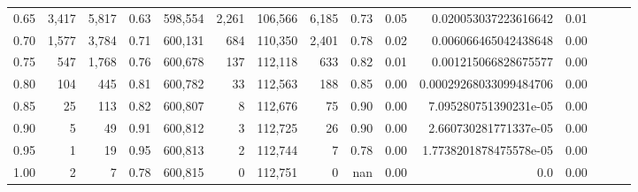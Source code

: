 \begin{tabular}{rrrrrrrrrrrrrrr}
0.65 &    3,417 &   5,817 &  0.63 &  598,554 &    2,261 &  106,566 &    6,185 &  0.73 &  0.05 &    0.020053037223616642 &      0.01 \\
0.70 &    1,577 &   3,784 &  0.71 &  600,131 &      684 &  110,350 &    2,401 &  0.78 &  0.02 &    0.006066465042438648 &      0.00 \\
0.75 &      547 &   1,768 &  0.76 &  600,678 &      137 &  112,118 &      633 &  0.82 &  0.01 &    0.001215066828675577 &      0.00 \\
0.80 &      104 &     445 &  0.81 &  600,782 &       33 &  112,563 &      188 &  0.85 &  0.00 &  0.00029268033099484706 &      0.00 \\
0.85 &       25 &     113 &  0.82 &  600,807 &        8 &  112,676 &       75 &  0.90 &  0.00 &   7.095280751390231e-05 &      0.00 \\
0.90 &        5 &      49 &  0.91 &  600,812 &        3 &  112,725 &       26 &  0.90 &  0.00 &   2.660730281771337e-05 &      0.00 \\
0.95 &        1 &      19 &  0.95 &  600,813 &        2 &  112,744 &        7 &  0.78 &  0.00 &  1.7738201878475578e-05 &      0.00 \\
1.00 &        2 &       7 &  0.78 &  600,815 &        0 &  112,751 &        0 &   nan &  0.00 &                     0.0 &      0.00 \\
\bottomrule
\end{tabular}
